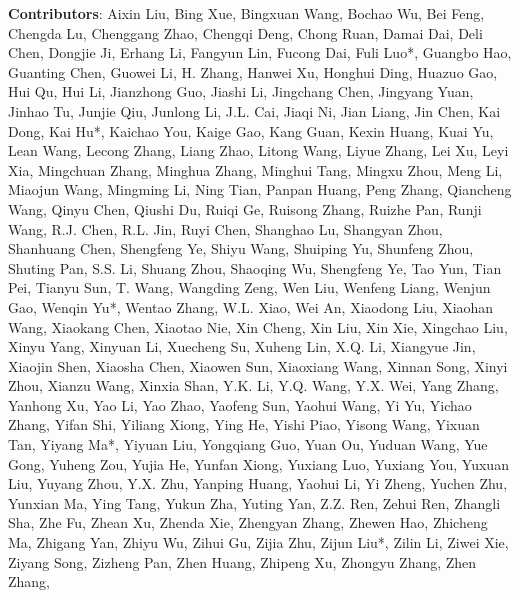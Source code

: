 \textbf{ Contributors}: Aixin Liu, Bing Xue, Bingxuan Wang, Bochao Wu, Bei Feng, Chengda Lu, Chenggang Zhao, Chengqi Deng, Chong Ruan, Damai Dai, Deli Chen, Dongjie Ji, Erhang Li, Fangyun Lin, Fucong Dai, Fuli Luo*, Guangbo Hao, Guanting Chen, Guowei Li, H. Zhang, Hanwei Xu, Honghui Ding, Huazuo Gao, Hui Qu, Hui Li, Jianzhong Guo, Jiashi Li, Jingchang Chen, Jingyang Yuan, Jinhao Tu, Junjie Qiu, Junlong Li, J.L. Cai, Jiaqi Ni, Jian Liang, Jin Chen, Kai Dong, Kai Hu*, Kaichao You, Kaige Gao, Kang Guan, Kexin Huang, Kuai Yu, Lean Wang, Lecong Zhang, Liang Zhao, Litong Wang, Liyue Zhang, Lei Xu, Leyi Xia, Mingchuan Zhang, Minghua Zhang, Minghui Tang, Mingxu Zhou, Meng Li, Miaojun Wang, Mingming Li, Ning Tian, Panpan Huang, Peng Zhang, Qiancheng Wang, Qinyu Chen, Qiushi Du, Ruiqi Ge, Ruisong Zhang, Ruizhe Pan, Runji Wang, R.J. Chen, R.L. Jin, Ruyi Chen, Shanghao Lu, Shangyan Zhou, Shanhuang Chen, Shengfeng Ye, Shiyu Wang, Shuiping Yu, Shunfeng Zhou, Shuting Pan, S.S. Li, Shuang Zhou, Shaoqing Wu, Shengfeng Ye, Tao Yun, Tian Pei, Tianyu Sun, T. Wang, Wangding Zeng, Wen Liu, Wenfeng Liang, Wenjun Gao, Wenqin Yu*, Wentao Zhang, W.L. Xiao, Wei An, Xiaodong Liu, Xiaohan Wang, Xiaokang Chen, Xiaotao Nie, Xin Cheng, Xin Liu, Xin Xie, Xingchao Liu, Xinyu Yang, Xinyuan Li, Xuecheng Su, Xuheng Lin, X.Q. Li, Xiangyue Jin, Xiaojin Shen, Xiaosha Chen, Xiaowen Sun, Xiaoxiang Wang, Xinnan Song, Xinyi Zhou, Xianzu Wang, Xinxia Shan, Y.K. Li, Y.Q. Wang, Y.X. Wei, Yang Zhang, Yanhong Xu, Yao Li, Yao Zhao, Yaofeng Sun, Yaohui Wang, Yi Yu, Yichao Zhang, Yifan Shi, Yiliang Xiong, Ying He, Yishi Piao, Yisong Wang, Yixuan Tan, Yiyang Ma*, Yiyuan Liu, Yongqiang Guo, Yuan Ou, Yuduan Wang, Yue Gong, Yuheng Zou, Yujia He, Yunfan Xiong, Yuxiang Luo, Yuxiang You, Yuxuan Liu, Yuyang Zhou, Y.X. Zhu, Yanping Huang, Yaohui Li, Yi Zheng, Yuchen Zhu, Yunxian Ma, Ying Tang, Yukun Zha, Yuting Yan, Z.Z. Ren, Zehui Ren, Zhangli Sha, Zhe Fu, Zhean Xu, Zhenda Xie, Zhengyan Zhang, Zhewen Hao, Zhicheng Ma, Zhigang Yan, Zhiyu Wu, Zihui Gu, Zijia Zhu, Zijun Liu*, Zilin Li, Ziwei Xie, Ziyang Song, Zizheng Pan, Zhen Huang, Zhipeng Xu, Zhongyu Zhang, Zhen Zhang,


